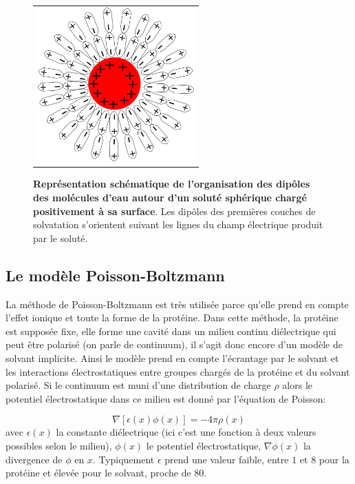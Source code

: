    \begin{figure}[!htbp]
     \centering
     \begin{tabular}{c}
       \includegraphics[width=6cm]{figure/ecrantage.png} &
     \end{tabular}
     
     \caption{\textbf{Représentation schématique de l'organisation des dipôles des molécules d'eau autour d'un soluté sphérique chargé positivement à sa surface}. Les dipôles des premières couches de solvatation s'orientent suivant les lignes du champ électrique produit par le soluté.}
\label{graph:ecrantage}
   \end{figure}
   
\subsection{Le modèle Poisson-Boltzmann}
La méthode de Poisson-Boltzmann est très utilisée parce qu'elle prend en compte l'effet ionique et toute la forme de la protéine. Dans cette méthode, la protéine est supposée fixe, elle forme une cavité dans un milieu continu diélectrique qui peut être polarisé (on parle de continuum), il s'agit donc encore d'un modèle de solvant implicite. Ainsi le modèle prend en compte l'écrantage par le solvant et les interactions électrostatiques entre groupes chargés de la protéine et du solvant polarisé. Si le continuum est muni d'une distribution de charge $\rho$ alors le potentiel électrostatique dans ce milieu est donné par l'équation de Poisson:

\begin{equation}
  \label{eq:poisson}
  \nabla [ \epsilon(x) \phi(x)] = - 4 \pi \rho(x)   
\end{equation}
avec $\epsilon(x)$ la constante diélectrique (ici c'est une fonction à deux valeurs possibles selon le milieu), $\phi (x)$ le potentiel électrostatique, $\nabla \phi(x)$ la divergence de $\phi$ en $x$.
Typiquement $\epsilon$ prend une valeur faible, entre $1$ et $8$ pour la protéine et élevée pour le solvant, proche de $80$.

